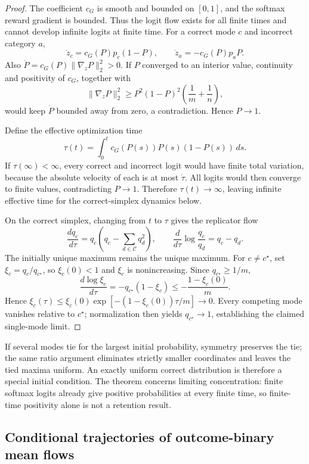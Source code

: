 \documentclass{article}
\newcommand{\enforcehalffinalproseline}{%
  \setlength{\parfillskip}{0pt plus .20\linewidth}}
\newcommand{\1}{\mathbf 1}
\theoremstyle{remark}
\theoremstyle{definition}
\theoremstyle{plain}
\begin{document}
\begin{proof}
\enforcehalffinalproseline
The coefficient $c_G$ is smooth and bounded on $[0,1]$, and the softmax
reward gradient is bounded. Thus the logit flow exists for all finite times
and cannot develop infinite logits at finite time.
For a correct mode $c$ and incorrect category $a$,
\[
  \dot z_c=c_G(P)p_c(1-P),
  \qquad
  \dot z_a=-c_G(P)p_aP.
\]
Also $\dot P=c_G(P)\lVert\nabla_zP\rVert_2^2>0$. If $P$ converged to an
interior value, continuity and positivity of $c_G$, together with
\[
 \lVert\nabla_zP\rVert_2^2
 \ge P^2(1-P)^2\left(\frac1m+\frac1n\right),
\]
would keep $\dot P$ bounded away from zero, a contradiction. Hence $P\to1$.

Define the effective optimization time
\[
  \tau(t)=\int_0^t c_G(P(s))P(s)(1-P(s))\,ds.
\]
If $\tau(\infty)<\infty$, every correct and incorrect logit would have finite
total variation, because the absolute velocity of each is at most $\dot\tau$.
All logits would then converge to finite values, contradicting $P\to1$.
Therefore $\tau(t)\to\infty$, leaving infinite effective time for the
correct-simplex dynamics below.

On the correct simplex, changing from $t$ to $\tau$ gives the replicator flow
\begin{equation}
  \frac{dq_c}{d\tau}
  =q_c\left(q_c-\sum_{d\in\mathcal C}q_d^2\right),
  \qquad
  \frac{d}{d\tau}\log\frac{q_c}{q_d}=q_c-q_d.
  \label{eq:grpo-replicator}
\end{equation}
The initially unique maximum remains the unique maximum. For $c\ne c^\star$,
set $\xi_c=q_c/q_{c^\star}$, so $\xi_c(0)<1$ and $\xi_c$ is nonincreasing.
Since $q_{c^\star}\ge1/m$,
\[
 \frac{d\log\xi_c}{d\tau}
 =-q_{c^\star}(1-\xi_c)
 \le-\frac{1-\xi_c(0)}{m}.
\]
Hence $\xi_c(\tau)\le\xi_c(0)\exp[-(1-\xi_c(0))\tau/m]\to0$.
Every competing mode vanishes relative to $c^\star$; normalization then
yields $q_{c^\star}\to1$, establishing the claimed single-mode limit.
\end{proof}

If several modes tie for the largest initial probability, symmetry preserves
the tie; the same ratio argument eliminates strictly smaller coordinates and
leaves the tied maxima uniform. An exactly uniform correct distribution is
therefore a special initial condition. The theorem concerns limiting
concentration: finite softmax logits already give positive probabilities at
every finite time, so finite-time positivity alone is not a retention result.

\subsection{Conditional trajectories of outcome-binary mean flows}
\label{app:theory-objective-inertness}
\end{document}
